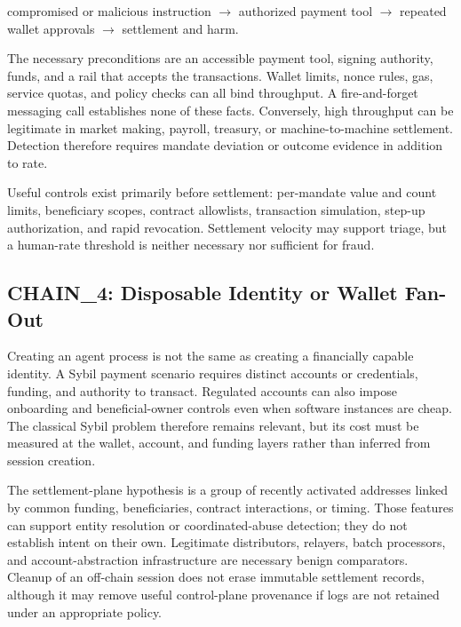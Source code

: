 \begin{center}
compromised or malicious instruction $\rightarrow$ authorized payment tool
$\rightarrow$ repeated wallet approvals $\rightarrow$ settlement and harm.
\end{center}

The necessary preconditions are an accessible payment tool, signing authority,
funds, and a rail that accepts the transactions.  Wallet limits, nonce rules,
gas, service quotas, and policy checks can all bind throughput.  A
fire-and-forget messaging call establishes none of these facts.  Conversely,
high throughput can be legitimate in market making, payroll, treasury, or
machine-to-machine settlement.  Detection therefore requires mandate deviation
or outcome evidence in addition to rate.

Useful controls exist primarily before settlement: per-mandate value and count
limits, beneficiary scopes, contract allowlists, transaction simulation,
step-up authorization, and rapid revocation.  Settlement velocity may support
triage, but a human-rate threshold is neither necessary nor sufficient for
fraud.

\subsection{CHAIN\_4: Disposable Identity or Wallet Fan-Out}\label{subsec:chain4}

Creating an agent process is not the same as creating a financially capable
identity.  A Sybil payment scenario requires distinct accounts or credentials,
funding, and authority to transact.  Regulated accounts can also impose
onboarding and beneficial-owner controls even when software instances are cheap.
The classical Sybil problem therefore remains relevant\cite{douceur2002}, but
its cost must be measured at the wallet, account, and funding layers rather
than inferred from session creation.

The settlement-plane hypothesis is a group of recently activated addresses
linked by common funding, beneficiaries, contract interactions, or timing.
Those features can support entity resolution or coordinated-abuse detection;
they do not establish intent on their own.  Legitimate distributors, relayers,
batch processors, and account-abstraction infrastructure are necessary benign
comparators.  Cleanup of an off-chain session does not erase immutable
settlement records, although it may remove useful control-plane provenance if
logs are not retained under an appropriate policy.

